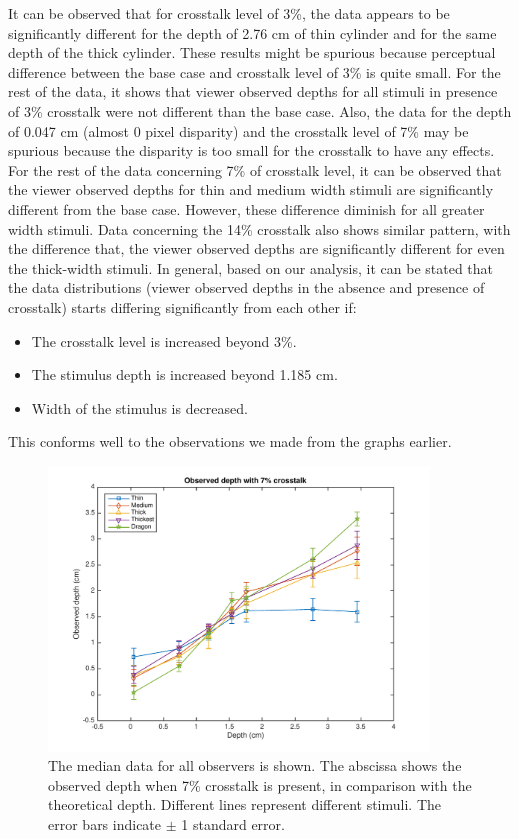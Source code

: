 It can be observed that for crosstalk level of 3\%, the data appears to be significantly different for the depth of 2.76 cm of thin cylinder and for the same depth of the thick cylinder. These results might be spurious because perceptual difference between the base case and crosstalk level of 3\% is quite small. For the rest of the data, it shows that viewer observed depths for all stimuli in presence of 3\% crosstalk were not different than the base case. 
Also, the data for the depth of 0.047 cm (almost 0 pixel disparity) and the crosstalk level of 7\% may be spurious because the disparity is too small for the crosstalk to have any effects. For the rest of the data concerning 7\% of crosstalk level, it can be observed that the viewer observed depths for thin and medium width stimuli are significantly different from the base case. However, these difference diminish for all greater width stimuli. Data concerning the 14\% crosstalk also shows similar pattern, with the difference that, the viewer observed depths are significantly different for even the thick-width stimuli. In general, based on our analysis, it can be stated that the data distributions (viewer observed depths in the absence and presence of crosstalk) starts differing significantly from each other if:
\begin{itemize}
  \item The crosstalk level is increased beyond 3\%.
  \item The stimulus depth is increased beyond 1.185 cm.
  \item Width of the stimulus is decreased.
\end{itemize}
This conforms well to the observations we made from the graphs earlier.
\pagebreak
\begin{figure}[H]
\centering
    \includegraphics[width=0.9\textwidth]{./Template_Figures/s_crosstalk_7}
    \caption{The median data for all observers is shown. The abscissa shows the observed depth when 7\% crosstalk is present, in comparison with the theoretical depth. Different lines represent different stimuli. The error bars indicate $\pm$ 1 standard error.\label{fig:s_crosstalk_7}}
\end{figure}

